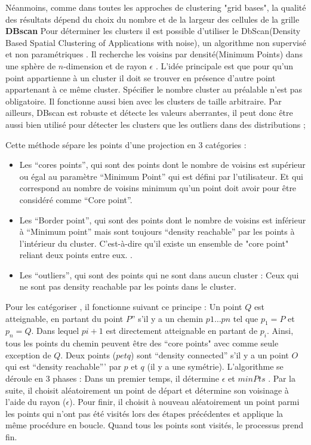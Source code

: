 Néanmoins, comme dans toutes les approches de clustering "grid bases", la qualité des résultats dépend du choix du nombre et de la largeur des cellules de la grille \cite{agrawal1998automatic}
\medskip
\newline
\textbf{DBscan} \newline
Pour déterminer les clusters il est possible d'utiliser le DbScan(Density Based Spatial Clustering of Applications with noise), un algorithme non supervisé et non paramétriques \cite{abbas2019clustme} . Il recherche les voisins par densité(Minimum Points) dans une sphère de $n$-dimension et de rayon $\epsilon$ .
L'idée principale est que pour qu’un point appartienne à un cluster il doit se trouver en présence d’autre point appartenant à ce même cluster.
Spécifier le nombre cluster au préalable n'est pas obligatoire. Il fonctionne aussi bien avec les clusters de taille arbitraire. Par ailleurs, DBscan est robuste et détecte les valeurs aberrantes, il peut donc être aussi bien 
utilisé pour détecter les clusters que les outliers dans des distributions \cite{towardsdatascience-DBSCAN};

Cette méthode sépare les points d'une projection en 3 catégories :
\begin{itemize}
    \item Les “cores points”, qui sont des points dont le nombre de voisins est supérieur ou égal au paramètre “Minimum Point” qui est défini par l’utilisateur. Et qui correspond au nombre de voisins minimum qu’un point doit avoir pour être considéré comme “Core point”.
    \item Les “Border point”, qui sont des points dont le nombre de voisins est inférieur à “Minimum point” mais sont toujours “density reachable” par les points à l’intérieur du cluster. C'est-à-dire qu'il existe un ensemble de "core point" reliant deux points entre eux. .
    \item Les “outliers”, qui sont des points qui ne sont dans aucun cluster : Ceux qui ne sont pas density reachable par les points dans le cluster.
\end{itemize}

Pour les catégoriser , il fonctionne suivant ce principe : 
Un point $Q$ est atteignable, en partant du point $P$” s’il y a un chemin $p1…pn$ tel que $p_1 = P$ et $p_n = Q$. Dans lequel $pi +1$ est directement atteignable en partant de $p_i$. 
Ainsi, tous les points du chemin peuvent être des “core points" avec comme seule exception de $Q$.
Deux points ($p et q$) sont “density connected” s’il y a un point $O$ qui est “density reachable”’ par $p$ et $q$ (il y a une symétrie).
\smallskip
L'algorithme se déroule en 3 phases :
Dans un premier temps, il détermine $\epsilon$ et $minPts$ . Par la suite, il choisit aléatoirement un point de départ et détermine son voisinage à l'aide du rayon ($\epsilon$). Pour finir, il choisit à nouveau aléatoirement un point parmi les points qui n'ont pas été visités lors des étapes précédentes et applique la même procédure en boucle.
Quand tous les points sont visités, le processus prend fin.\newline

